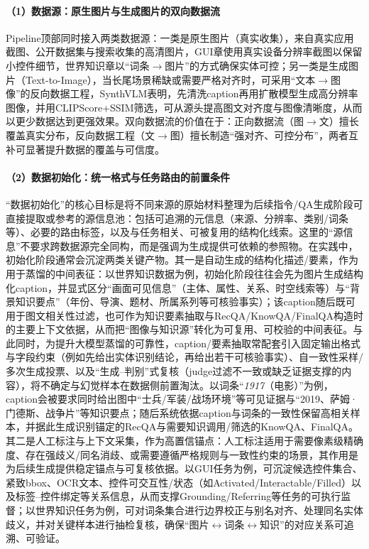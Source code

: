 \paragraph{（1）数据源：原生图片与生成图片的双向数据流}
Pipeline顶部同时接入两类数据源：一类是原生图片（真实收集），来自真实应用截图、公开数据集与搜索收集的高清图片，GUI章使用真实设备分辨率截图以保留小控件细节，世界知识章以“词条$\rightarrow$图片”的方式确保实体可控；另一类是生成图片（Text-to-Image），当长尾场景稀缺或需要严格对齐时，可采用“文本$\rightarrow$图像”的反向数据工程，SynthVLM表明，先清洗caption再用扩散模型生成高分辨率图像，并用CLIPScore+SSIM筛选，可从源头提高图文对齐度与图像清晰度，从而以更少数据达到更强效果\citep{liu2025synthvlm,hessel2021clipscore,wang2004ssim}。双向数据流的价值在于：正向数据流（图$\rightarrow$文）擅长覆盖真实分布，反向数据工程（文$\rightarrow$图）擅长制造“强对齐、可控分布”，两者互补可显著提升数据的覆盖与可信度。

\paragraph{（2）数据初始化：统一格式与任务路由的前置条件}
“数据初始化”的核心目标是将不同来源的原始材料整理为后续指令/QA生成阶段可直接提取或参考的源信息池：包括可追溯的元信息（来源、分辨率、类别/词条等）、必要的路由标签，以及与任务相关、可被复用的结构化线索。这里的“源信息”不要求跨数据源完全同构，而是强调为生成提供可依赖的参照物。在实践中，初始化阶段通常会沉淀两类关键产物。其一是自动生成的结构化描述/要素，作为用于蒸馏的中间表征：以世界知识数据为例，初始化阶段往往会先为图片生成结构化caption，并显式区分“画面可见信息”（主体、属性、关系、时空线索等）与“背景知识要点”（年份、导演、题材、所属系列等可核验事实）；该caption随后既可用于图文相关性过滤，也可作为知识要素抽取与RecQA/\allowbreak KnowQA/\allowbreak FinalQA构造时的主要上下文依据，从而把“图像与知识源”转化为可复用、可校验的中间表征。与此同时，为提升大模型蒸馏的可靠性，caption/要素抽取常配套引入固定输出格式与字段约束（例如先给出实体识别结论，再给出若干可核验事实）、自一致性采样/多次生成投票、以及“生成--判别”式复核（judge过滤不一致或缺乏证据支撑的内容），将不确定与幻觉样本在数据侧前置淘汰。以词条“\emph{1917}（电影）”为例，caption会被要求同时给出图中“士兵/军装/战场环境”等可见证据与“2019、萨姆·门德斯、战争片”等知识要点；随后系统依据caption与词条的一致性保留高相关样本，并据此生成识别锚定的RecQA与需要知识调用/筛选的KnowQA、FinalQA。其二是人工标注与上下文采集，作为高置信锚点：人工标注适用于需要像素级精确度、存在强歧义/同名消歧、或需要遵循严格规则与一致性约束的场景，其作用是为后续生成提供稳定锚点与可复核依据。以GUI任务为例，可沉淀候选控件集合、紧致bbox、OCR文本、控件可交互性/状态（如Activated/\allowbreak Interactable/\allowbreak Filled）以及标签--控件绑定等关系信息，从而支撑Grounding/\allowbreak Referring等任务的可执行监督；以世界知识任务为例，可对词条集合进行边界校正与别名对齐、处理同名实体歧义，并对关键样本进行抽检复核，确保“图片$\leftrightarrow$词条$\leftrightarrow$知识”的对应关系可追溯、可验证。

